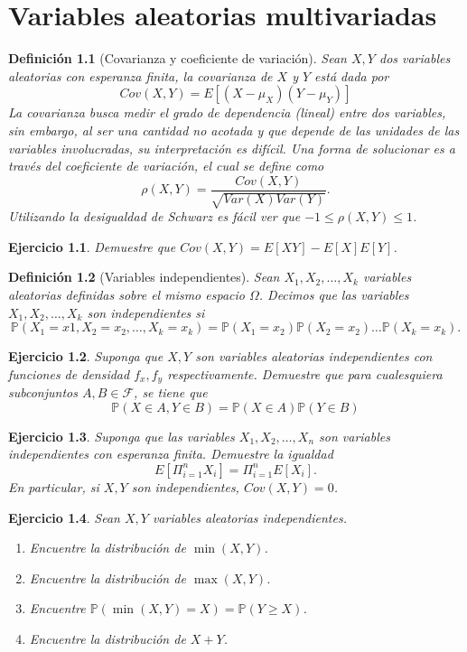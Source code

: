 \documentclass[11pt]{report}
\theoremstyle{break}
\newtheorem{definicion}{Definición}[chapter]
\newtheorem{ejercicio}{Ejercicio}[chapter]
\theoremstyle{break}
\begin{document}
\chapter{Variables aleatorias multivariadas}
\label{capitulo:variables aleatorias multivariadas}
\begin{definicion}[Covarianza y coeficiente de variación]
\label{definicion:covarianza}
Sean $X,Y$ dos variables aleatorias con esperanza finita, la covarianza de $X$ y $Y$ está dada por
$$
Cov(X,Y) = E[(X - \mu_{X})(Y - \mu_{Y})]
$$
La covarianza busca medir el grado de dependencia (lineal) entre dos variables, sin embargo, al ser una cantidad no acotada y que depende de las unidades de las variables involucradas, su interpretación es difícil. Una forma de solucionar es a través del coeficiente de variación, el cual se define como
$$
\rho(X,Y) = \dfrac{ Cov(X,Y)  }{ \sqrt{Var(X) Var(Y)} }.
$$
Utilizando la desigualdad de Schwarz es fácil ver que $-1\leq \rho(X,Y) \leq 1$.
\end{definicion}


\begin{ejercicio}
Demuestre que $Cov(X,Y) = E[XY] - E[X]E[Y]$.
\end{ejercicio}

\begin{definicion}[Variables independientes]
Sean $X_1, X_2,\ldots,X_k$ variables aleatorias definidas sobre el mismo espacio $\Omega$. Decimos que las variables $X_1, X_2,\ldots,X_k$ son independientes si
$$
\mathbb{P}(X_1 = x1, X_2 = x_2, \ldots, X_k = x_k) = \mathbb{P}(X_1 = x_2)\mathbb{P}(X_2 = x_2)\ldots\mathbb{P}(X_k = x_k).
$$
\end{definicion}

\begin{ejercicio}
Suponga que $X,Y$ son variables aleatorias independientes con funciones de densidad $f_x, f_y$ respectivamente. Demuestre que para cualesquiera subconjuntos $A,B \in \mathcal{F}$, se tiene que
$$
\mathbb{P}(X \in A, Y \in B) = \mathbb{P}(X \in A)\mathbb{P}(Y \in B)
$$
\end{ejercicio}

\begin{ejercicio}
Suponga que las variables $X_1, X_2, \ldots, X_n$ son variables independientes con esperanza finita. Demuestre la igualdad
$$
E[\Pi_{i=1}^{n}X_i] = \Pi_{i=1}^{n}E[X_i].
$$
En particular, si $X,Y$ son independientes, $Cov(X,Y) = 0$.
\end{ejercicio}

\begin{ejercicio}
Sean $X,Y$ variables aleatorias independientes.
\begin{enumerate}[label=\alph*)]
\item Encuentre la distribución de $\min(X,Y)$.
\item Encuentre la distribución de $\max(X,Y)$.
\item Encuentre $\mathbb{P}(\min(X,Y) = X) = \mathbb{P}(Y \geq X)$.
\item Encuentre la distribución de $X + Y$.
\end{enumerate}
\end{ejercicio}
\end{document}
